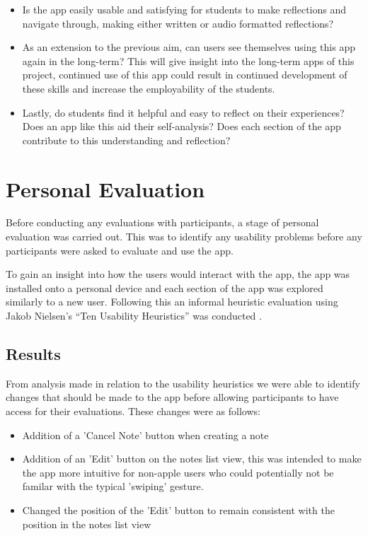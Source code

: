 \documentclass{l4proj}
\begin{document}
\begin{itemize}
    \item Is the app easily usable and satisfying for students to make reflections and navigate through, making either written or audio formatted reflections?
    \item As an extension to the previous aim, can users see themselves using this app again in the long-term? This will give insight into the long-term apps of this project, continued use of this app could result in continued development of these skills and increase the employability of the students.
    \item Lastly, do students find it helpful and easy to reflect on their experiences? Does an app like this aid their self-analysis? Does each section of the app contribute to this understanding and reflection?
\end{itemize}

\section{Personal Evaluation}
Before conducting any evaluations with participants, a stage of personal evaluation was carried out. This was to identify any usability problems before any participants were asked to evaluate and use the app. 
 
To gain an insight into how the users would interact with the app, the app was installed onto a personal device and each section of the app was explored similarly to a new user. Following this an informal heuristic evaluation using Jakob Nielsen’s “Ten Usability Heuristics” was conducted \citep{Nielsen10}. 

\subsection{Results}
From analysis made in relation to the usability heuristics we were able to identify changes that should be made to the app before allowing participants to have access for their evaluations. These changes were as follows:
\begin{itemize}
    \item Addition of a 'Cancel Note' button when creating a note
    \item Addition of an 'Edit' button on the notes list view, this was intended to make the app more intuitive for non-apple users who could potentially not be familar with the typical 'swiping' gesture.
    \item Changed the position of the 'Edit' button to remain consistent with the position in the notes list view
\end{itemize}
\end{document}
